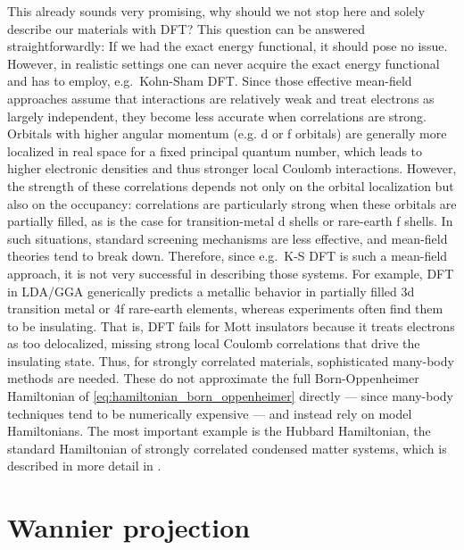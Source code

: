 \documentclass[../../main.tex]{subfiles}
\begin{document}
This already sounds very promising, why should we not stop here and solely describe our materials with DFT? This question can be answered straightforwardly: If we had the exact energy functional, it should pose no issue. However, in realistic settings one can never acquire the exact energy functional and has to employ, e.g.\ Kohn-Sham DFT. Since those effective mean-field approaches assume that interactions are relatively weak and treat electrons as largely independent, they become less accurate when correlations are strong. Orbitals with higher angular momentum (e.g. d or f orbitals) are generally more localized in real space for a fixed principal quantum number, which leads to higher electronic densities and thus stronger local Coulomb interactions. However, the strength of these correlations depends not only on the orbital localization but also on the occupancy: correlations are particularly strong when these orbitals are partially filled, as is the case for transition-metal d shells or rare-earth f shells. In such situations, standard screening mechanisms are less effective, and mean-field theories tend to break down. Therefore, since e.g.\ K-S DFT is such a mean-field approach, it is not very successful in describing those systems. For example, DFT in LDA/GGA generically predicts a metallic behavior in partially filled 3d transition metal or 4f rare-earth elements, whereas experiments often find them to be insulating. That is, DFT fails for Mott insulators because it treats electrons as too delocalized, missing strong local Coulomb correlations that drive the insulating state. Thus, for strongly correlated materials, sophisticated many-body methods are needed. These do not approximate the full Born-Oppenheimer Hamiltonian of \eqref{eq:hamiltonian_born_oppenheimer} directly --- since many-body techniques tend to be numerically expensive --- and instead rely on model Hamiltonians. The most important example is the Hubbard Hamiltonian, the standard Hamiltonian of strongly correlated condensed matter systems, which is described in more detail in . 


\section{Wannier projection}
\end{document}
